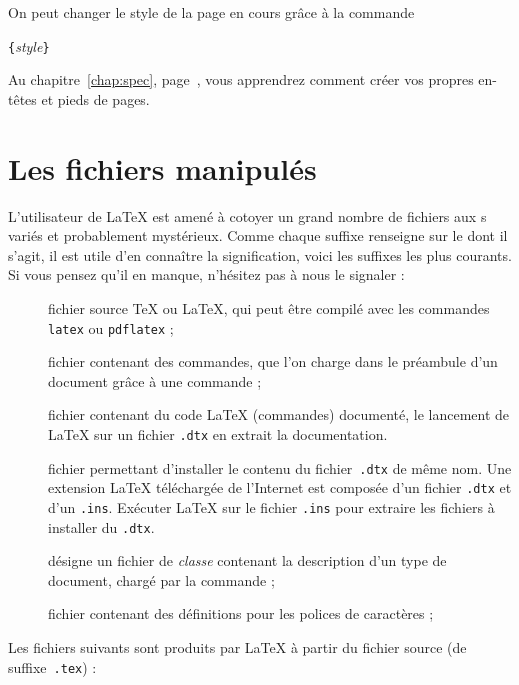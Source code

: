 On peut changer le style de la page en cours grâce à la commande
\begin{lscommand}
\verb|{|\emph{style}\verb|}|
\end{lscommand}

Au chapitre~\ref{chap:spec}, page~\pageref{sec:fancyhdr}, vous apprendrez
comment créer vos propres en-têtes et pieds de pages.


\section{Les fichiers manipulés}

L'utilisateur de \LaTeX{} est amené à cotoyer un grand nombre de
fichiers aux s  variés et
probablement mystérieux. Comme chaque suffixe renseigne sur
le  dont il s'agit, il est utile d'en connaître la
signification, voici les suffixes les plus courants. Si vous pensez
qu'il en manque, n'hésitez pas à nous le signaler :

\begin{description}
\item[] fichier source \TeX{} ou \LaTeX{}, qui peut être
  compilé avec les commandes \texttt{latex} ou \texttt{pdflatex} ;
\item[] fichier contenant des commandes, que l'on charge dans le
  préambule d'un document grâce à une commande  ;
\item[] fichier contenant du code \LaTeX{} (commandes) documenté,
  le lancement de \LaTeX{} sur un fichier \texttt{.dtx} en extrait la
  documentation.
\item[] fichier permettant d'installer le contenu du
  fichier~\texttt{.dtx} de même nom. Une extension \LaTeX{}
  téléchargée de l'Internet est composée d'un fichier \texttt{.dtx} et
  d'un \texttt{.ins}. Exécuter \LaTeX{} sur le fichier \texttt{.ins}
  pour extraire les fichiers à installer du \texttt{.dtx}.
\item[] désigne un fichier de \emph{classe} contenant la
  description d'un type de document, chargé par la commande
  ;
\item[] fichier contenant des définitions pour les polices de
  caractères ;
\end{description}

Les fichiers suivants sont produits par \LaTeX{} à partir du fichier
source (de suffixe~\texttt{.tex}) :

